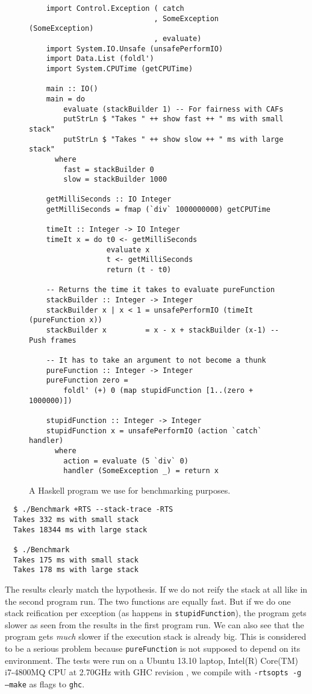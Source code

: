 \begin{figure}
\begin{mdframed}
  \begin{verbatim}
    import Control.Exception ( catch
                             , SomeException (SomeException)
                             , evaluate)
    import System.IO.Unsafe (unsafePerformIO)
    import Data.List (foldl')
    import System.CPUTime (getCPUTime)

    main :: IO()
    main = do
        evaluate (stackBuilder 1) -- For fairness with CAFs
        putStrLn $ "Takes " ++ show fast ++ " ms with small stack"
        putStrLn $ "Takes " ++ show slow ++ " ms with large stack"
      where
        fast = stackBuilder 0
        slow = stackBuilder 1000

    getMilliSeconds :: IO Integer
    getMilliSeconds = fmap (`div` 1000000000) getCPUTime

    timeIt :: Integer -> IO Integer
    timeIt x = do t0 <- getMilliSeconds
                  evaluate x
                  t <- getMilliSeconds
                  return (t - t0)

    -- Returns the time it takes to evaluate pureFunction
    stackBuilder :: Integer -> Integer
    stackBuilder x | x < 1 = unsafePerformIO (timeIt (pureFunction x))
    stackBuilder x         = x - x + stackBuilder (x-1) -- Push frames

    -- It has to take an argument to not become a thunk
    pureFunction :: Integer -> Integer
    pureFunction zero =
        foldl' (+) 0 (map stupidFunction [1..(zero + 1000000)])

    stupidFunction :: Integer -> Integer
    stupidFunction x = unsafePerformIO (action `catch` handler)
      where
        action = evaluate (5 `div` 0)
        handler (SomeException _) = return x
  \end{verbatim}
  \caption{A Haskell program we use for benchmarking purposes.}
  \label{fig:benchmark_program}
\end{mdframed}
\end{figure}

\begin{verbatim}
  $ ./Benchmark +RTS --stack-trace -RTS
  Takes 332 ms with small stack
  Takes 18344 ms with large stack

  $ ./Benchmark
  Takes 175 ms with small stack
  Takes 178 ms with large stack
\end{verbatim}

The results clearly match the hypothesis. If we do not reify the stack
at all like in the second program run. The two functions are equally
fast. But if we do one stack reification per exception (as happens in
\texttt{stupidFunction}), the program gets slower as seen from the
results in the first program run. We can also see that the program
gets \emph{much} slower if the execution stack is already big. This
is considered to be a serious problem because \texttt{pureFunction}
is not supposed to depend on its environment. 
The tests were run on a Ubuntu 13.10 laptop, Intel(R) Core(TM) i7-4800MQ CPU at
2.70GHz with GHC revision \cite{github_benchmarking_revision}, we compile with
\texttt{-rtsopts -g --make} as flags to \texttt{ghc}.

